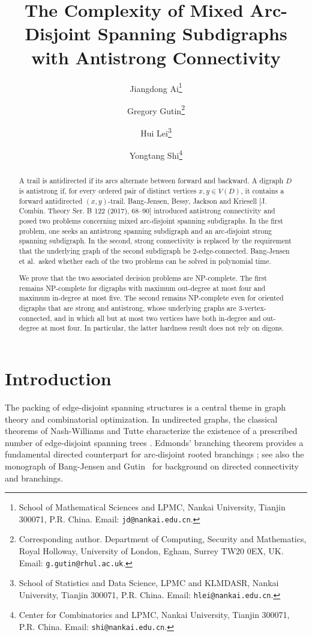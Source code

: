 \documentclass[12pt]{article}
\title{The Complexity of Mixed Arc-Disjoint Spanning Subdigraphs with Antistrong Connectivity}
\author{
Jiangdong Ai\thanks{School of Mathematical Sciences and LPMC,
Nankai University, Tianjin 300071, P.R. China.
Email: {\tt jd@nankai.edu.cn}.}
\and
Gregory Gutin\thanks{Corresponding author. Department of Computing, Security and Mathematics,
Royal Holloway, University of London, Egham, Surrey TW20 0EX, UK.
Email: {\tt g.gutin@rhul.ac.uk}.}
\and
Hui Lei\thanks{School of Statistics and Data Science, LPMC and KLMDASR,
Nankai University, Tianjin 300071, P.R. China.
Email: {\tt hlei@nankai.edu.cn}.}
\and
Yongtang Shi\thanks{Center for Combinatorics and LPMC,
Nankai University, Tianjin 300071, P.R. China.
Email: {\tt shi@nankai.edu.cn}.}}
\date{}
\theoremstyle{remark}
\begin{document}
\maketitle

\begin{abstract}
A trail is antidirected if its arcs alternate between forward and backward. A digraph $D$  is antistrong if, for every ordered pair of distinct vertices $x,y\in V(D)$, it contains a forward antidirected $(x,y)$-trail. Bang-Jensen, Bessy, Jackson and Kriesell
[J. Combin. Theory Ser. B 122 (2017), 68--90]
introduced antistrong connectivity and posed two problems concerning
mixed arc-disjoint spanning subdigraphs.  In the first problem, one
seeks an antistrong spanning subdigraph and an arc-disjoint strong
spanning subdigraph.  In the second, strong connectivity is replaced
by the requirement that the underlying graph of the second
subdigraph be 2-edge-connected.  Bang-Jensen et al.\ asked whether
each of the two problems can be solved in polynomial time.

We prove that the two associated decision problems are NP-complete.
The first remains NP-complete for digraphs with maximum out-degree
at most four and maximum in-degree at most five.  The second remains
NP-complete even for oriented digraphs that are strong and
antistrong, whose underlying graphs are 3-vertex-connected, and in
which all but at most two vertices have both in-degree and out-degree
at most four.  In particular, the latter hardness result does not
rely on digons.
\end{abstract}


\section{Introduction}

The packing of edge-disjoint spanning structures is a central theme in
graph theory and combinatorial optimization.  In undirected graphs, the
classical theorems of Nash-Williams and Tutte characterize the existence
of a prescribed number of edge-disjoint spanning trees
\cite{NashWilliams,Tutte}.  Edmonds' branching theorem provides a
fundamental directed counterpart for arc-disjoint rooted branchings
\cite{Edmonds}; see also the monograph of Bang-Jensen and
Gutin~\cite{BJGbook} for background on directed connectivity and
branchings.
\end{document}
